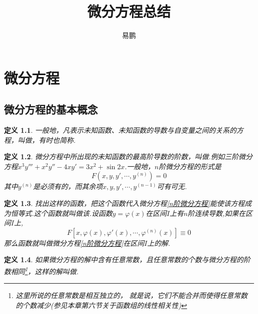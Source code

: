 \documentclass[12pt,a4paper]{book}
\title{微分方程总结}\author{易鹏}
\numberwithin{equation}{section}
\newtheorem{defination}{\hspace*{0.3cm}\color{dy}\FiveFlowerOpen \hspace*{0.2cm}定义}[section]
\begin{document}
\maketitle %
\newpage
{}
\setcounter{page}{0}%
\tableofcontents
\thispagestyle{empty}


\newpage
{}
\setcounter{page}{1}
\chapter{微分方程}
\section{微分方程的基本概念}
\vspace*{0.3cm}

\begin{defination}
    \hspace*{0.3cm}一般地，凡表示未知函数、未知函数的导数与自变量之间的关系的方程，叫做，有时也简称.
\end{defination}

\begin{defination}
    \hspace*{0.3cm}微分方程中所出现的未知函数的最高阶导数的阶数，叫做.例如三阶微分方程$x^3y'''+x^2y''-4xy'=3x^2+\sin{2x}$.一般地，$n$阶微分方程的形式是
    \begin{equation}
        F(x,y,y',\cdots ,y^{(n)})=0\label{n阶微分方程}
    \end{equation}
    其中$y^{(n)}$是必须有的，而其余项$x,y,y',\cdots ,y^{(n-1)}$可有可无.
\end{defination}

\begin{defination}
    \hspace*{0.3cm}找出这样的函数，把这个函数代入微分方程\eqref{n阶微分方程}能使该方程成为恒等式.这个函数就叫做该.设函数$y=\varphi(x)$在区间$I$上有$n$阶连续导数,如果在区间$I$上,
    $$F\left[x,\varphi(x),\varphi'(x),\cdots ,\varphi^{(n)}(x)\right]\equiv 0$$
    那么函数就叫做微分方程\eqref{n阶微分方程}在区间$I$上的解.
\end{defination}

\begin{defination}
    \hspace*{0.3cm}如果微分方程的解中含有任意常数，且任意常数的个数与微分方程的阶数相同\footnote{这里所说的任意常数是相互独立的， 就是说，它们不能合并而使得任意常数的个数减少(参见本章第六节关于函数组的线性相关性)}，这样的解叫做.
\end{defination}
\end{document}
